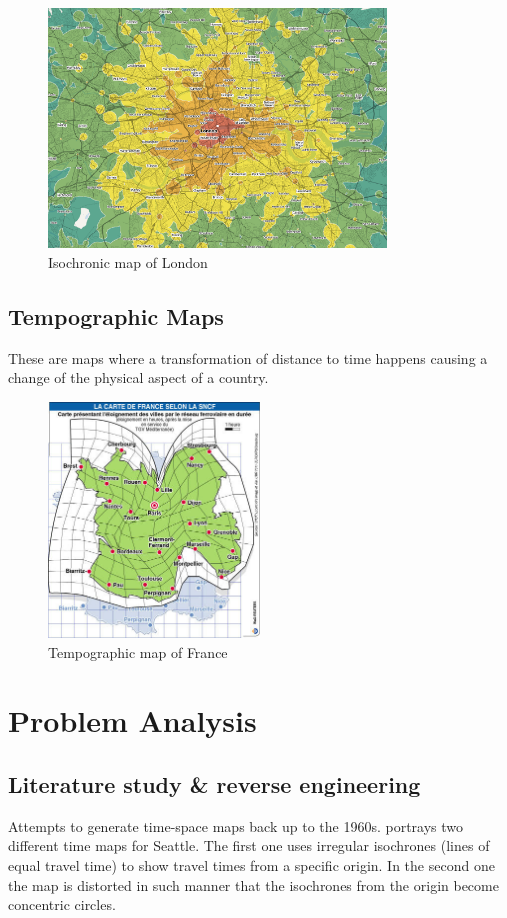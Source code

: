 \documentclass[a4paper,11pt]{article}
\begin{document}
\begin{figure}[h!]
  \centering
  \includegraphics[width=0.8\textwidth]{London.png}
  \caption{Isochronic map of London}
  \label{london}
\end{figure}

\subsection{Tempographic Maps}
These are maps where a transformation of distance to time happens causing a change of
the physical aspect of a country.

\begin{figure}[h!]
  \centering
  \includegraphics[width=0.5\textwidth]{france.png}
  \caption{Tempographic map of France}
  \label{france}
\end{figure}

\section{Problem Analysis}
\subsection{Literature study \& reverse engineering}
Attempts to generate time-space maps back up to the 1960s.  portrays two
different time maps for Seattle. The first one uses irregular isochrones (lines of equal travel
time) to show travel times from a specific origin. In the second one the map is distorted in
such manner that the isochrones from the origin become concentric circles.
\end{document}
